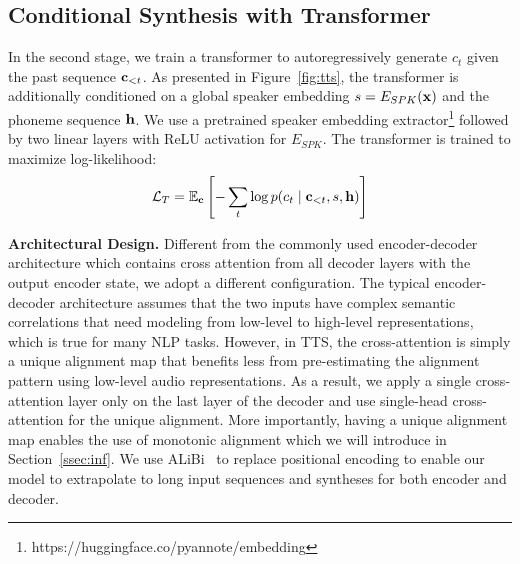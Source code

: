 \documentclass[letterpaper]{article} %
\begin{document}


\subsection{Conditional Synthesis with Transformer}
In the second stage, we train a transformer to autoregressively generate $c_t$ given the past sequence $\vb{c}_{<t}$.
As presented in Figure~\ref{fig:tts}, the transformer is additionally conditioned on a global speaker embedding $s = E_{SPK}(\vb{x})$ and the phoneme sequence $\vb{h}$.
We use a pretrained speaker embedding extractor\footnote{https://huggingface.co/pyannote/embedding} followed by two linear layers with ReLU activation for $E_{SPK}$.
The transformer is trained to maximize log-likelihood:
\begin{gather}
    \mathcal{L}_T = \mathbb{E}_{\vb{c}}\left[-\sum_{t}\log{p(c_{t}\mid \vb{c}_{<t}, s, \vb{h})}\right]
\end{gather}

\textbf{Architectural Design.}
Different from the commonly used encoder-decoder architecture which contains cross attention from all decoder layers with the output encoder state, we adopt a different configuration.
The typical encoder-decoder architecture assumes that the two inputs have complex semantic correlations that need modeling from low-level to high-level representations, which is true for many NLP tasks.
However, in TTS, the cross-attention is simply a unique alignment map that benefits less from pre-estimating the alignment pattern using low-level audio representations.
As a result, we apply a single cross-attention layer only on the last layer of the decoder and use single-head cross-attention for the unique alignment.
More importantly, having a unique alignment map enables the use of monotonic alignment which we will introduce in Section~\ref{ssec:inf}.
We use ALiBi~\cite{alibi} to replace positional encoding to enable our model to extrapolate to long input sequences and syntheses for both encoder and decoder.
\end{document}
